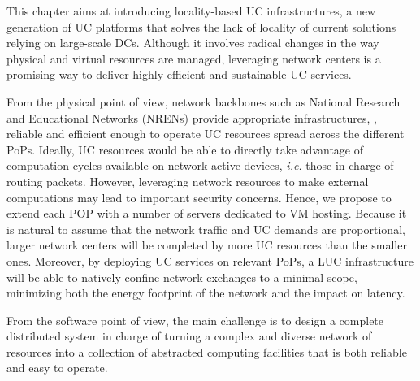 

This chapter aims at introducing locality-based UC infrastructures, a new
generation of UC platforms that solves the lack of locality of current
solutions relying on large-scale DCs. Although it involves radical changes in
the way physical and virtual resources are managed,  leveraging network centers
is a promising way to deliver highly efficient and sustainable UC services. 

From the physical point of view, network backbones such as National Research and Educational Networks (NRENs) provide
appropriate infrastructures, \ie, reliable and efficient enough to operate UC
resources spread across the different PoPs. Ideally, UC resources would be able to
directly
take advantage of computation cycles available on network active devices, \textit{i.e.} those
in charge of routing packets. However, leveraging network resources to make external
computations may lead to important security concerns. Hence, we propose to extend each
POP with a number of servers dedicated to VM hosting.
Because it is natural to assume that the network traffic and UC demands are proportional, larger network
centers will be completed by more UC resources than the smaller ones. Moreover, by deploying
UC services on relevant PoPs, a LUC infrastructure will be able to natively confine
network exchanges to a minimal scope, minimizing both the energy footprint of the network
and the impact on latency.

From the software point of view, the main challenge is to design a complete distributed
system in charge of turning a complex and diverse network of resources into a collection
of abstracted computing facilities that is both reliable and easy to operate.

